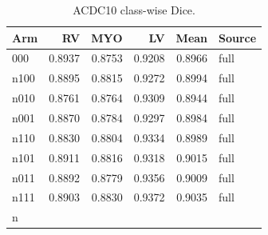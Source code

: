 \begin{table}[t]
\centering
\caption{ACDC10 class-wise Dice.}
\begin{tabular}{lrrrrl}
\toprule
Arm & RV & MYO & LV & Mean & Source \\
\midrule
000 & 0.8937 & 0.8753 & 0.9208 & 0.8966 & full \\n100 & 0.8895 & 0.8815 & 0.9272 & 0.8994 & full \\n010 & 0.8761 & 0.8764 & 0.9309 & 0.8944 & full \\n001 & 0.8870 & 0.8784 & 0.9297 & 0.8984 & full \\n110 & 0.8830 & 0.8804 & 0.9334 & 0.8989 & full \\n101 & 0.8911 & 0.8816 & 0.9318 & 0.9015 & full \\n011 & 0.8892 & 0.8779 & 0.9356 & 0.9009 & full \\n111 & 0.8903 & 0.8830 & 0.9372 & 0.9035 & full \\n\bottomrule
\end{tabular}
\end{table}

